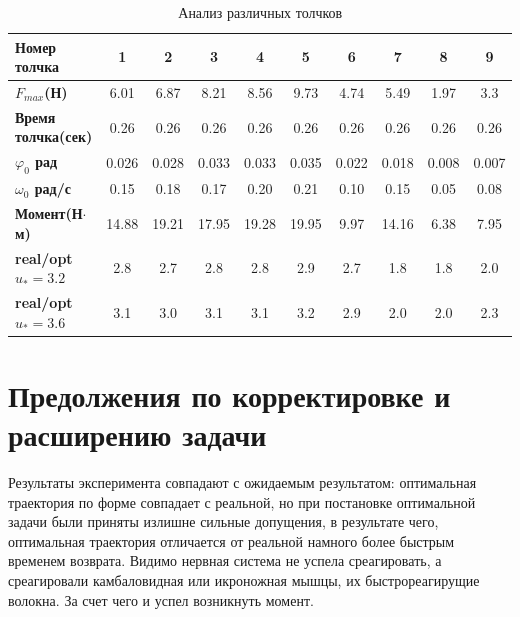 \documentclass[a4paper,12pt, openany]{book}
\theoremstyle{plain} %
\theoremstyle{definition} %
\theoremstyle{remark} %
\numberwithin{equation}{chapter}
\begin{document}
{\begin{table}[h!]
    \centering
    \begin{tabular}{|l|c|c|c|c|c|c|c|c|c|}
        \hline
        \textbf{Номер толчка}       & \textbf{1} & \textbf{2} & \textbf{3} & \textbf{4} & \textbf{5} & \textbf{6} & \textbf{7} & \textbf{8} & \textbf{9} \\ \hline
        \textbf{$F_{max}$(Н)}       & 6.01       & 6.87       & 8.21       & 8.56       & 9.73       & 4.74       & 5.49       & 1.97       & 3.3        \\ \hline
        \textbf{Время толчка(сек)}  & 0.26       & 0.26       & 0.26       & 0.26       & 0.26       & 0.26       & 0.26       & 0.26       & 0.26       \\ \hline
        \textbf{$\varphi_0$ рад}        & 0.026      & 0.028      & 0.033      & 0.033      & 0.035      & 0.022      & 0.018      & 0.008      & 0.007      \\ \hline
        \textbf{$\omega_0$ рад/с}         & 0.15     & 0.18     & 0.17     & 0.20     & 0.21     & 0.10     & 0.15     & 0.05     & 0.08     \\ \hline
        \textbf{Момент(Н$\cdot$м)}       & 14.88      & 19.21      & 17.95      & 19.28      & 19.95      & 9.97       & 14.16      & 6.38       & 7.95       \\ \hline
        \textbf{real/opt $u_*=3.2$} & 2.8        & 2.7        & 2.8        & 2.8        & 2.9        & 2.7        & 1.8        & 1.8        & 2.0        \\ \hline
        \textbf{real/opt $u_*=3.6$} & 3.1        & 3.0        & 3.1        & 3.1        & 3.2        & 2.9        & 2.0        & 2.0        & 2.3        \\ \hline
    \end{tabular}
    \caption{Анализ различных толчков}
    \label{final_table}
\end{table}
\newpage
\section{Предолжения по корректировке и расширению задачи}

Результаты эксперимента совпадают с ожидаемым результатом: оптимальная траектория по форме совпадает с реальной,
 но при постановке оптимальной задачи были приняты излишне сильные допущения, в результате чего, оптимальная траектория отличается от реальной намного более быстрым временем возврата.
Видимо нервная система не успела среагировать, а среагировали камбаловидная или икроножная мышцы, их быстрореагирущие волокна.
За счет чего и успел возникнуть момент.

}
\end{document}
